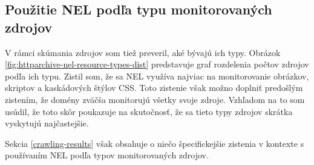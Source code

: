 
\subsection{Použitie NEL podľa typu monitorovaných zdrojov}

V rámci skúmania zdrojov som tiež preveril, aké bývajú ich typy.
Obrázok \ref{fig:httparchive-nel-resource-types-dist} predstavuje graf rozdelenia počtov zdrojov podľa ich typu.
Zistil som, že sa NEL využíva najviac na monitorovanie obrázkov, skriptov a kaskádových štýlov CSS.
Toto zistenie však možno doplniť predošlým zistením, že domény zväčša monitorujú všetky svoje zdroje.
Vzhľadom na to som usúdil, že toto skôr poukazuje na skutočnosť, že sa tieto typy zdrojov skrátka vyskytujú najčastejšie.

Sekcia \ref{crawling-results} však obsahuje o niečo špecifickejšie zistenia v kontexte s používaním NEL podľa typov monitorovaných zdrojov. 

